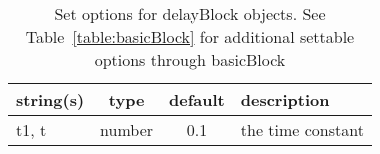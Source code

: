 \begin{table}[ht]
\centering
\begin{tabular}{p{5cm} c c p{7cm}}
\hline
string(s) & type & default & description \\
\hline
t1, t & number & 0.1 & the time constant\\
\hline
\end{tabular}
\caption{Set options for delayBlock objects. See Table~\ref{table:basicBlock} for additional settable options through basicBlock}
\label{table:delayBlock}
\end{table}

